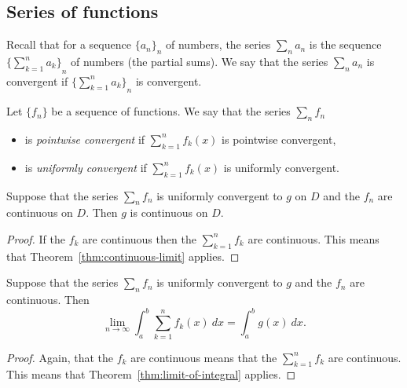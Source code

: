 \subsection*{Series of functions}



Recall that for a sequence \({\{a_n\}}_{n}\) of numbers,
the series \(\sum_{n}a_n\) is the sequence \({\{\sum_{k=1}^{n}a_k\}}_{n}\) of numbers (the partial sums).
We say that the series  \(\sum_{n}a_n\) is convergent if \({\{\sum_{k=1}^{n}a_k\}}_{n}\) is convergent.



\begin{definition}
  Let \(\{f_n\}\) be a sequence of functions.
  We say that the series \(\sum_{n} f_n\)
  \begin{itemize}
    \item   is \emph{pointwise convergent} if
          \(\sum_{k=1}^{n} f_k(x)\) is pointwise convergent,
    \item   is \emph{uniformly convergent} if
          \(\sum_{k=1}^{n} f_k(x)\) is uniformly convergent.
  \end{itemize}
\end{definition}


\begin{theorem}
  Suppose that the series \(\sum_{n} f_n\) is uniformly convergent to \(g\) on \(D\) and the \(f_n\) are continuous on \(D\).
  Then \(g\) is continuous on \(D\).
\end{theorem}


\begin{proof}
  If the \(f_k\) are continuous then the \(\sum_{k=1}^{n} f_k\) are continuous.
  This means that Theorem~\ref{thm:continuous-limit} applies.
\end{proof}



\begin{theorem}
  Suppose that the series \(\sum_{n} f_n\) is uniformly convergent to \(g\) and the \(f_n\) are continuous.
  Then
  \[
    \lim_{n\to\infty} \int_{a}^{b}  \sum_{k=1}^{n} f_k(x)  \ dx = \int_{a}^{b} g(x) \ dx.
  \]
\end{theorem}


\begin{proof}
  Again, that the \(f_k\) are continuous means that the \(\sum_{k=1}^{n} f_k\) are continuous.
  This means that Theorem~\ref{thm:limit-of-integral} applies.
\end{proof}


